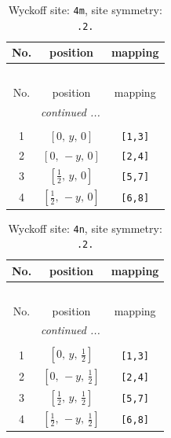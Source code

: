 \documentclass[fleqn,8pt]{jsarticle}
\begin{document}
\renewcommand{\arraystretch}{1.2}
\begin{longtable}{ccc}
\caption{Wyckoff site: {\tt 4m}, site symmetry: {\tt .2.}}
 \\
 \hline \hline
No. & position & mapping \\ \hline \endfirsthead

\multicolumn{2}{l}{\tablename\ \thetable{}} \\
 \hline \hline
No. & position & mapping \\ \hline \endhead

 \hline \hline
\multicolumn{2}{r}{\footnotesize\it continued ...} \\ \endfoot

 \hline \hline
\multicolumn{2}{r}{} \\ \endlastfoot

1 & $\left[ 0,\, y,\, 0 \right]$ & {\tt [1,3]} \\ \hline
2 & $\left[ 0,\, - y,\, 0 \right]$ & {\tt [2,4]} \\ \hline
3 & $\left[ \frac{1}{2},\, y,\, 0 \right]$ & {\tt [5,7]} \\ \hline
4 & $\left[ \frac{1}{2},\, - y,\, 0 \right]$ & {\tt [6,8]} \\
\end{longtable}
\renewcommand{\arraystretch}{1.2}
\begin{longtable}{ccc}
\caption{Wyckoff site: {\tt 4n}, site symmetry: {\tt .2.}}
 \\
 \hline \hline
No. & position & mapping \\ \hline \endfirsthead

\multicolumn{2}{l}{\tablename\ \thetable{}} \\
 \hline \hline
No. & position & mapping \\ \hline \endhead

 \hline \hline
\multicolumn{2}{r}{\footnotesize\it continued ...} \\ \endfoot

 \hline \hline
\multicolumn{2}{r}{} \\ \endlastfoot

1 & $\left[ 0,\, y,\, \frac{1}{2} \right]$ & {\tt [1,3]} \\ \hline
2 & $\left[ 0,\, - y,\, \frac{1}{2} \right]$ & {\tt [2,4]} \\ \hline
3 & $\left[ \frac{1}{2},\, y,\, \frac{1}{2} \right]$ & {\tt [5,7]} \\ \hline
4 & $\left[ \frac{1}{2},\, - y,\, \frac{1}{2} \right]$ & {\tt [6,8]} \\
\end{longtable}
\end{document}
